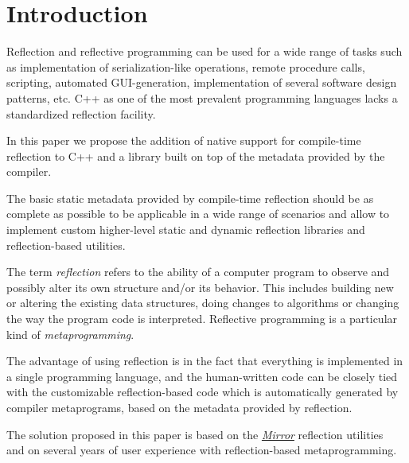 \section{Introduction}

Reflection and reflective programming can be used
for a wide range of tasks such as implementation of serialization-like operations,
remote procedure calls, scripting, automated GUI-generation,
implementation of several software design patterns, etc.
C++ as one of the most prevalent programming languages 
lacks a standardized reflection facility.

In this paper we propose the addition of native support for
compile-time reflection to C++ and a library built
on top of the metadata provided by the compiler.

The basic static metadata provided by compile-time reflection
should be as complete as possible to be applicable in a wide
range of scenarios and allow to implement custom higher-level
static and dynamic reflection libraries and reflection-based
utilities.

The term \emph{reflection} refers to the ability of a computer program
to observe and possibly alter its own structure and/or its behavior.
This includes building new or altering the existing data structures,
doing changes to algorithms or changing the way the program code
is interpreted. Reflective programming is a particular kind
of \emph{metaprogramming}.

The advantage of using reflection is in the fact that everything
is implemented in a single programming language, and the human-written
code can be closely tied with the customizable reflection-based
code which is automatically generated by compiler metaprograms,
based on the metadata provided by reflection.

The solution proposed in this paper is based on the
\href{http://kifri.fri.uniza.sk/~chochlik/mirror-lib/html/}{\em Mirror}
reflection utilities~\cite{mirror-doc-cpp11} and on several years
of user experience with reflection-based metaprogramming.
